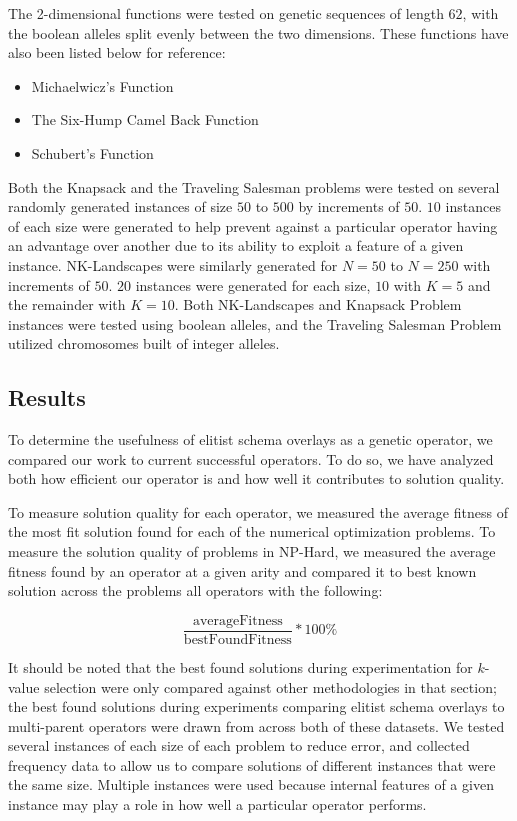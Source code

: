 The 2-dimensional functions were tested on genetic sequences of length $62$, with the boolean alleles split evenly between the two dimensions. These functions have also been listed below for reference:

\begin{itemize}
\item Michaelwicz's Function
\item The Six-Hump Camel Back Function
\item Schubert's Function
\end{itemize}

Both the Knapsack and the Traveling Salesman problems were tested on several randomly generated instances of size $50$ to $500$ by increments of $50$. $10$ instances of each size were generated to help prevent against a particular operator having an advantage over another due to its ability to exploit a feature of a given instance. NK-Landscapes were similarly generated for $N = 50$ to $N = 250$ with increments of $50$. $20$ instances were generated for each size, $10$ with $K = 5$ and the remainder with $K = 10$. Both NK-Landscapes and Knapsack Problem instances were tested using boolean alleles, and the Traveling Salesman Problem utilized chromosomes built of integer alleles.

\subsection*{Results}
To determine the usefulness of elitist schema overlays as a genetic operator, we compared our work to current successful operators. To do so, we have analyzed both how efficient our operator is and how well it contributes to solution quality. 

To measure solution quality for each operator, we measured the average fitness of the most fit solution found for each of the numerical optimization problems. To measure the solution quality of problems in NP-Hard, we measured the average fitness found by an operator at a given arity and compared it to best known solution across the problems all operators with the following:

\[ \frac{\text{averageFitness}}{\text{bestFoundFitness}} * 100\% \]

It should be noted that the best found solutions during experimentation for $k$-value selection were only compared against other methodologies in that section; the best found solutions during experiments comparing elitist schema overlays to multi-parent operators were drawn from across both of these datasets. We tested several instances of each size of each problem to reduce error, and collected frequency data to allow us to compare solutions of different instances that were the same size. Multiple instances were used because internal features of a given instance may play a role in how well a particular operator performs. 

